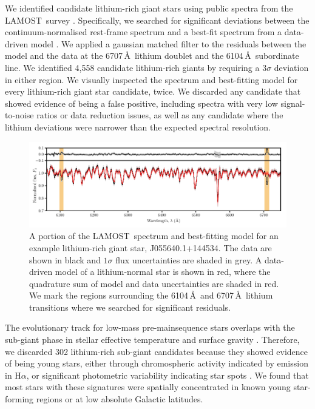 \documentclass[twocolumn]{aastex62}
\newcommand\lamost{LAMOST}
\begin{document}
We identified candidate lithium-rich giant stars using public spectra from 
the \lamost\ survey \citep[Data Release 2;][]{Luo_2015}. Specifically, we searched for significant
deviations between the continuum-normalised rest-frame spectrum 
and a best-fit spectrum from a data-driven model \citep[Figure~\ref{fig:spectrum};][]{Ho_2017a,Ho_2017b}. We applied a gaussian matched filter to the 
residuals between the model and the data at the 6707\,\AA\ lithium doublet 
and the 6104\,\AA\ subordinate line.  We identified 4,558 candidate 
lithium-rich giants by requiring a $3\sigma$ deviation in either region. 
We visually inspected the spectrum and best-fitting model for every 
lithium-rich giant star candidate, twice. We discarded any candidate that 
showed evidence of being a false positive, including spectra with very low
signal-to-noise ratios or data reduction issues, as well as any candidate where the lithium 
deviations were narrower than the expected spectral resolution.

\begin{figure}
    \includegraphics[width=\textwidth]{figure3}
        \caption{A portion of the \lamost\ spectrum and best-fitting model for an example lithium-rich giant star, J055640.1+144534.
        The data are shown in black and $1\sigma$ flux uncertainties are shaded in grey. A data-driven model of a lithium-normal star is shown in red, where the quadrature sum of model and data uncertainties are shaded in red. We mark the regions surrounding the 6104\,\AA\ and 6707\,\AA\ lithium transitions where we searched for significant residuals.}
    \label{fig:spectrum}
\end{figure} 



The evolutionary track for low-mass pre-mainsequence stars overlaps with
the sub-giant phase in stellar effective temperature and surface 
gravity \citep{Dotter_2016,Choi_2016}. Therefore, we discarded 302 
lithium-rich sub-giant candidates because they showed evidence of being 
young stars, either through chromospheric activity indicated by emission 
in H$\alpha$, or significant photometric variability indicating star 
spots \citep{McQuillan_2014}. We found that most stars with these signatures were
spatially concentrated in known young star-forming regions or at low 
absolute Galactic latitudes. 
\end{document}
